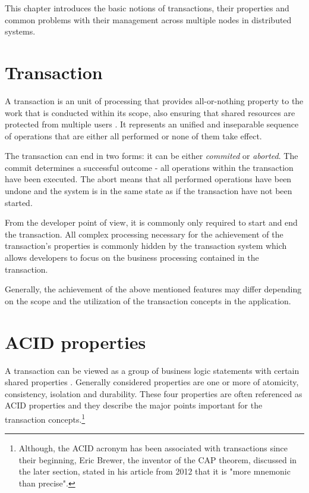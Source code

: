 \documentclass[oneside,
  digital, %
  table,   %
  lof,     %
  lot,     %
]{fithesis3}
\begin{document}
This chapter introduces the basic notions of transactions, their properties and common problems with their management across multiple nodes in distributed systems. 

\section{Transaction}

A transaction is an unit of processing that provides all-or-nothing property to the work that is conducted within its scope, also ensuring that shared resources are protected from multiple users \cite{java_tran_processing}. It represents an unified and inseparable sequence of operations that are either all performed or none of them take effect. 

The transaction can end in two forms: it can be either \textit{commited} or \textit{aborted}. The commit determines a successful outcome - all operations within the transaction have been executed. The abort means that all performed operations have been undone and the system is in the same state as if the transaction have not been started.

From the developer point of view, it is commonly only required to start and end the transaction. All complex processing necessary for the achievement of the transaction's properties is commonly hidden by the transaction system \cite{java_tran_processing} which allows developers to focus on the business processing contained in the transaction.

Generally, the achievement of the above mentioned features may differ depending on the scope and the utilization of the transaction concepts in the application.

\section{ACID properties}

A transaction can be viewed as a group of business logic statements with certain shared properties \cite{nar_wf}. Generally considered properties are one or more of atomicity, consistency, isolation and durability. These four properties are often referenced as ACID properties \cite{haerder_reuter_1983} and they describe the major points important for the transaction concepts.\footnote{Although, the ACID acronym has been associated with transactions since their beginning, Eric Brewer, the inventor of the CAP theorem, discussed in the later section, stated in his article from 2012 that it is "more mnemonic than precise".\cite{cap_12years}}
\end{document}
